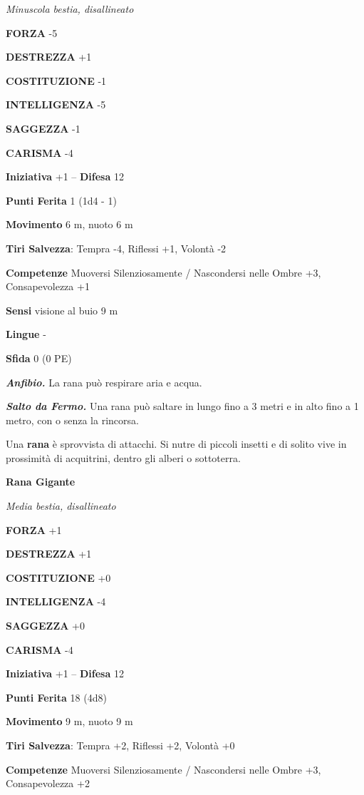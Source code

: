 \begin{multicols}{2}
\emph{Minuscola bestia, disallineato}

\textbf{FORZA} -5

\textbf{DESTREZZA} +1

\textbf{COSTITUZIONE} -1

\textbf{INTELLIGENZA} -5

\textbf{SAGGEZZA} -1

\textbf{CARISMA} -4

\textbf{Iniziativa} +1 -- \textbf{Difesa} 12

\textbf{Punti Ferita} 1 (1d4 - 1)

\textbf{Movimento} 6 m, nuoto 6 m

\textbf{Tiri Salvezza}:  Tempra -4, Riflessi +1, Volontà -2

\textbf{Competenze} Muoversi Silenziosamente / Nascondersi nelle Ombre +3, Consapevolezza +1

\textbf{Sensi} visione al buio 9 m

\textbf{Lingue} -

\textbf{Sfida} 0 (0 PE)

\emph{\textbf{Anfibio.}} La rana può respirare aria e acqua.

\emph{\textbf{Salto da Fermo.}} Una rana può saltare in lungo fino a 3 metri e in alto fino a 1 metro, con o senza la rincorsa.

Una \textbf{rana} è sprovvista di attacchi. Si nutre di piccoli insetti e di solito vive in prossimità di acquitrini, dentro gli alberi o sottoterra.

\medskip\textbf{Rana Gigante}

\emph{Media bestia, disallineato}

\textbf{FORZA} +1

\textbf{DESTREZZA} +1

\textbf{COSTITUZIONE} +0

\textbf{INTELLIGENZA} -4

\textbf{SAGGEZZA} +0

\textbf{CARISMA} -4

\textbf{Iniziativa} +1 -- \textbf{Difesa} 12

\textbf{Punti Ferita} 18 (4d8)

\textbf{Movimento} 9 m, nuoto 9 m

\textbf{Tiri Salvezza}: Tempra +2, Riflessi +2, Volontà +0 

\textbf{Competenze} Muoversi Silenziosamente / Nascondersi nelle Ombre +3, Consapevolezza +2


\end{multicols}
